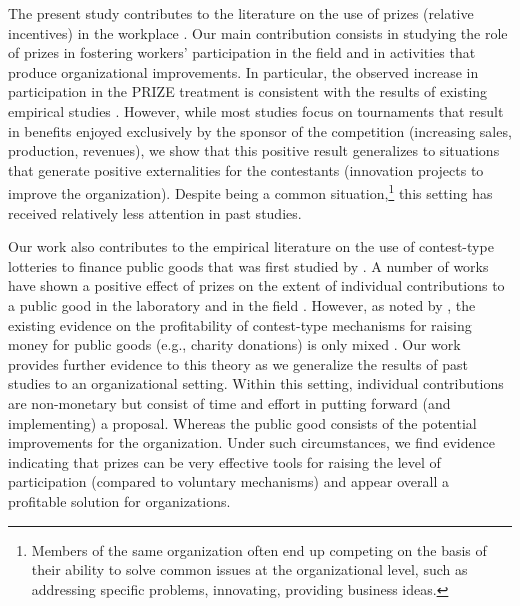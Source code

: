 \documentclass[11pt, titlepage]{article}
\begin{document}
The present study contributes to the literature on the use of prizes
(relative incentives) in the workplace \citep[among
others]{lazear1981rank, green1983comparison, mary1984economic}. Our main
contribution consists in studying the role of prizes in fostering
workers' participation in the field and in activities that produce
organizational improvements. In particular, the observed increase in
participation in the PRIZE treatment is consistent with the results of
existing empirical studies
\citep{bull1987tournaments, knoeber1994testing, eriksson1999executive, ehrenberg1990tournaments, terwiesch2008innovation, terwiesch2009innovation, boudreau2011incentives, boudreau2016performance}.
However, while most studies focus on tournaments that result in benefits
enjoyed exclusively by the sponsor of the competition (increasing sales,
production, revenues), we show that this positive result generalizes to
situations that generate positive externalities for the contestants
(innovation projects to improve the organization). Despite being a
common situation,\footnote{Members of the same organization often end up
  competing on the basis of their ability to solve common issues at the
  organizational level, such as addressing specific problems,
  innovating, providing business ideas.} this setting has received
relatively less attention in past studies.

Our work also contributes to the empirical literature on the use of
contest-type lotteries to finance public goods that was first studied by
\citet{morgan2000financing}. A number of works have shown a positive
effect of prizes on the extent of individual contributions to a public
good in the laboratory
\citep{morgan2000funding, dale2004charitable, lange2007using} and in the
field \citep{landry2006toward}. However, as noted by
\citet{vesterlund2012voluntary}, the existing evidence on the
profitability of contest-type mechanisms for raising money for public
goods (e.g., charity donations) is only mixed
\citep{vesterlund2012voluntary}. Our work provides further evidence to
this theory as we generalize the results of past studies to an
organizational setting. Within this setting, individual contributions
are non-monetary but consist of time and effort in putting forward (and
implementing) a proposal. Whereas the public good consists of the
potential improvements for the organization. Under such circumstances,
we find evidence indicating that prizes can be very effective tools for
raising the level of participation (compared to voluntary mechanisms)
and appear overall a profitable solution for organizations.
\end{document}
